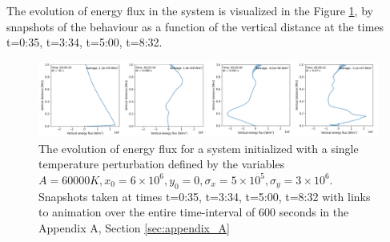 \documentclass[10pt, nofootinbib, twocolumn]{revtex4-1}
\begin{document}
The evolution of energy flux in the system is visualized in the Figure \ref{fig:single_enflux}, by snapshots of the behaviour as a function of the vertical distance at the times t=0:35, t=3:34, t=5:00, t=8:32. \\
\begin{figure}
    \centering
    \includegraphics[width =1\textwidth]{figures/single_energy_flux.png}
    \caption{The evolution of energy flux for a system initialized with a single temperature perturbation defined by the variables $A=60000 K, x_0=6\times 10^6, y_0=0, \sigma_x=5\times 10^5, \sigma_y=3\times 10^6$. Snapshots taken at times t=0:35, t=3:34, t=5:00, t=8:32 with links to animation over the entire time-interval of 600 seconds in the Appendix A, Section \ref{sec:appendix_A} }
    \label{fig:single_enflux}
\end{figure}
\end{document}
